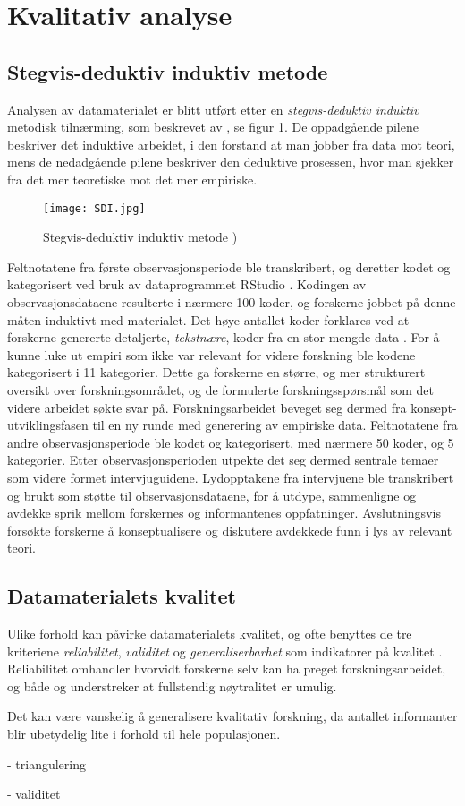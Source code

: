 \section{Kvalitativ analyse}
\label{section:kvalitativ_analyse} 

\subsection{Stegvis-deduktiv induktiv metode}
Analysen av datamaterialet er blitt utført etter en \textit{stegvis-deduktiv induktiv} metodisk tilnærming, som beskrevet av \citet{Tjora}, se figur \ref{SDI}. De oppadgående pilene beskriver det induktive arbeidet, i den forstand at man jobber fra data mot teori, mens de nedadgående pilene beskriver den deduktive prosessen, hvor man sjekker fra det mer teoretiske mot det mer empiriske. 

\begin{figure}[H]
\centering
\texttt{[image: SDI.jpg]}
\caption{Stegvis-deduktiv induktiv metode \citep{Tjora})}
\label{SDI}
\end{figure}

\noindent
Feltnotatene fra første observasjonsperiode ble transkribert, og deretter kodet og kategorisert ved bruk av dataprogrammet RStudio \citep{Rstudio}. Kodingen av observasjonsdataene resulterte i nærmere 100 koder, og forskerne jobbet på denne måten induktivt med materialet. Det høye antallet koder forklares ved at forskerne genererte detaljerte, \textit{tekstnære}, koder fra en stor mengde data \citep{Tjora}. For å kunne luke ut empiri som ikke var relevant for videre forskning ble kodene kategorisert i 11 kategorier. Dette ga forskerne en større, og mer strukturert oversikt over forskningsområdet, og de formulerte forskningsspørsmål som det videre arbeidet søkte svar på. Forskningsarbeidet beveget seg dermed fra konsept-utviklingsfasen til en ny runde med generering av empiriske data. Feltnotatene fra andre observasjonsperiode ble kodet og kategorisert, med nærmere 50 koder, og 5 kategorier. Etter observasjonsperioden utpekte det seg dermed sentrale temaer som videre formet intervjuguidene. Lydopptakene fra intervjuene ble transkribert og brukt som støtte til observasjonsdataene, for å utdype, sammenligne og avdekke sprik mellom forskernes og informantenes oppfatninger. Avslutningsvis forsøkte forskerne å konseptualisere og diskutere avdekkede funn i lys av relevant teori. 


\subsection{Datamaterialets kvalitet}
Ulike forhold kan påvirke datamaterialets kvalitet, og ofte benyttes de tre kriteriene \textit{reliabilitet}, \textit{validitet} og \textit{generaliserbarhet} som indikatorer på kvalitet \citep{Tjora}. Reliabilitet omhandler hvorvidt forskerne selv kan ha preget forskningsarbeidet, og både \citet{Oates} og \citet{Tjora} understreker at fullstendig nøytralitet er umulig. 

Det kan være vanskelig å generalisere kvalitativ forskning, da antallet informanter blir ubetydelig lite i forhold til hele populasjonen. 



- triangulering

- validitet

